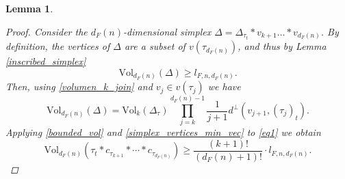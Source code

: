 \documentclass[11pt,a4paper,twoside]{amsart}
\theoremstyle{plain}
\newtheorem{lemma}[theorem]{\bfseries Lemma}
\theoremstyle{definition}
\newcommand{\vol}[0]{\mathrm{Vol}}
\renewcommand{\geq}{\geqslant}
\begin{document}
\begin{lemma}
\begin{proof}
Consider the $d_F(n)$-dimensional simplex $\Delta = \Delta_{\tau_t} * v_{k+1}\dots * v_{d_F(n)}$. By definition, the vertices of $\Delta$ are a subset of $v(\tau_{d_F(n)})$, and thus by Lemma \ref{inscribed_simplex} 
\begin{equation}\label{bounded_vol}
    \vol_{d_F(n)}(\Delta)\geq l_{F,n,d_F(n)}.
\end{equation} 
Then, using \eqref{volumen_k_join} and $v_j\in v(\tau_j)$ we have
\begin{equation}\label{simplex_vertices_min_vec}
    \vol_{d_F(n)}(\Delta) = \vol_k(\Delta_{\tau}) \prod_{j = k}^{d_F(n)-1} \frac{1}{j+1}d^\perp (v_{j+1}, (\tau_j)_t) .
\end{equation}
Applying \eqref{bounded_vol} and \eqref{simplex_vertices_min_vec} to \eqref{eq1} we obtain
$$\vol_{d_F(n)}(\tau_t * c_{\tau_{k+1}} * \cdots *  c_{\tau_{d_F(n)}}) \geq  \frac{(k+1)!}{(d_F(n)+1)!}\cdot l_{F,n,d_F(n)}.$$
\end{proof}
\end{lemma}
\end{document}
